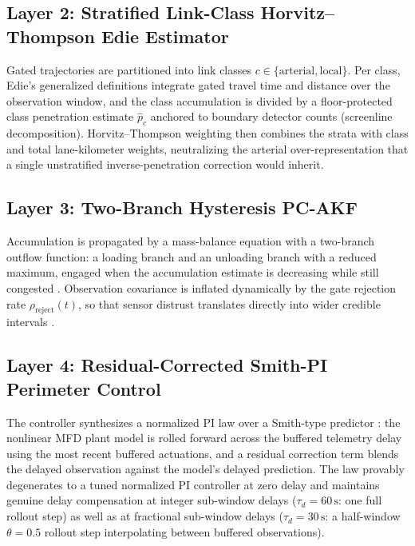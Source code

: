 \documentclass[a4paper,fleqn]{cas-dc}
\begin{document}
\subsection{Layer 2: Stratified Link-Class Horvitz--Thompson Edie Estimator}
Gated trajectories are partitioned into link classes $c \in \{\text{arterial}, \text{local}\}$. Per class, Edie's generalized definitions \cite{edie1963discussion} integrate gated travel time and distance over the observation window, and the class accumulation is divided by a floor-protected class penetration estimate $\hat{p}_c$ anchored to boundary detector counts (screenline decomposition). Horvitz--Thompson weighting \cite{horvitz1952generalization} then combines the strata with class and total lane-kilometer weights, neutralizing the arterial over-representation that a single unstratified inverse-penetration correction would inherit.

\subsection{Layer 3: Two-Branch Hysteresis PC-AKF}
Accumulation is propagated by a mass-balance equation with a two-branch outflow function: a loading branch and an unloading branch with a reduced maximum, engaged when the accumulation estimate is decreasing while still congested \cite{gayah2011hysteresis,geroliminis2011b}. Observation covariance is inflated dynamically by the gate rejection rate $\rho_{\text{reject}}(t)$, so that sensor distrust translates directly into wider credible intervals \cite{kalman1960new,wang2005real,saeedmanesh2021extended}.

\subsection{Layer 4: Residual-Corrected Smith-PI Perimeter Control}
The controller synthesizes a normalized PI law over a Smith-type predictor \cite{smith1957closer,normeyrico2008dead}: the nonlinear MFD plant model is rolled forward across the buffered telemetry delay using the most recent buffered actuations, and a residual correction term blends the delayed observation against the model's delayed prediction. The law provably degenerates to a tuned normalized PI controller at zero delay and maintains genuine delay compensation at integer sub-window delays ($\tau_d = 60\,\text{s}$: one full rollout step) as well as at fractional sub-window delays ($\tau_d = 30\,\text{s}$: a half-window $\theta = 0.5$ rollout step interpolating between buffered observations).
\end{document}
